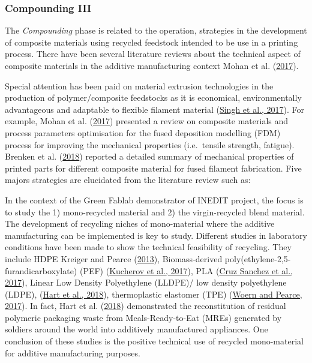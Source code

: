 \documentclass[
  11pt,
]{article}
\begin{document}
\hypertarget{compounding-iii}{%
\subsubsection{Compounding III}\label{compounding-iii}}

The \emph{Compounding} phase is related to the operation, strategies in
the development of composite materials using recycled feedstock intended
to be use in a printing process. There have been several literature
reviews about the technical aspect of composite materials in the
additive manufacturing context Mohan et al.
(\protect\hyperlink{ref-Mohan2017}{2017}).

Special attention has been paid on material extrusion technologies in
the production of polymer/composite feedstocks as it is economical,
environmentally advantageous and adaptable to flexible filament material
(\protect\hyperlink{ref-Singh2017}{Singh et al., 2017}). For example,
Mohan et al. (\protect\hyperlink{ref-Mohan2017}{2017}) presented a
review on composite materials and process parameters optimisation for
the fused deposition modelling (FDM) process for improving the
mechanical properties (i.e.~tensile strength, fatigue). Brenken et al.
(\protect\hyperlink{ref-Brenken2017}{2018}) reported a detailed summary
of mechanical properties of printed parts for different composite
material for fused filament fabrication. Five majors strategies are
elucidated from the literature review such as:

In the context of the Green Fablab demonstrator of INEDIT project, the
focus is to study the 1) mono-recycled material and 2) the
virgin-recycled blend material. The development of recycling niches of
mono-material where the additive manufacturing can be implemented is key
to study. Different studies in laboratory conditions have been made to
show the technical feasibility of recycling. They include HDPE Kreiger
and Pearce (\protect\hyperlink{ref-Kreiger2013}{2013}), Biomass-derived
poly(ethylene-2,5-furandicarboxylate) (PEF)
(\protect\hyperlink{ref-Kucherov2017}{Kucherov et al., 2017}), PLA
(\protect\hyperlink{ref-CruzSanchez2017}{Cruz Sanchez et al., 2017}),
Linear Low Density Polyethylene (LLDPE)/ low density polyethylene
(LDPE), (\protect\hyperlink{ref-Hart2018}{Hart et al., 2018}),
thermoplastic elastomer (TPE) (\protect\hyperlink{ref-Woern2017}{Woern
and Pearce, 2017}). In fact, Hart et al.
(\protect\hyperlink{ref-Hart2018}{2018}) demonstrated the reconstitution
of residual polymeric packaging waste from Meals-Ready-to-Eat (MREs)
generated by soldiers around the world into additively manufactured
appliances. One conclusion of these studies is the positive technical
use of recycled mono-material for additive manufacturing purposes.
\end{document}
